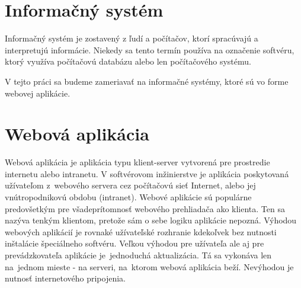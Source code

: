 \documentclass[a4paper, upjsfrontpage, disablespecwarning, thesismargins, thesislinespacing]{rnthesis}
\begin{document}

\section{Informačný systém}

Informačný systém je zostavený z ľudí a počítačov, ktorí spracúvajú a interpretujú informácie.
Niekedy sa tento termín používa na označenie softvéru, ktorý využíva počítačovú databázu alebo len počítačového systému.
\cite{1}

V tejto práci sa budeme zameriavať na informačné systémy, ktoré sú vo forme webovej aplikácie.


\section{Webová aplikácia}

Webová aplikácia je aplikácia typu klient-server vytvorená pre prostredie internetu alebo intranetu.
V softvérovom inžinierstve je aplikácia poskytovaná užívateľom z~webového servera cez počítačovú sieť Internet, 
alebo jej vnútropodni\-kovú obdobu (intranet). 
Webové aplikácie sú populárne predovšetkým pre všade\-prítomnosť webového prehliadača ako klienta. 
Ten sa nazýva tenkým klientom, pretože sám o sebe logiku aplikácie nepozná.
Výhodou webových aplikácií je rovnaké užívateľské rozhranie kdekoľvek bez nutnosti inštalácie špeciálneho softvéru. 
Veľkou výhodou pre užívateľa ale aj pre prevádzkovateľa aplikácie je~jednoduchá aktualizácia. 
Tá sa vykonáva len na~jednom mieste - na serveri, na~ktorom webová aplikácia beží. Nevýhodou je nutnosť internetového pripojenia.
\cite{2}

\end{document}

